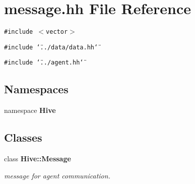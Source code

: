 \section{message.hh File Reference}
\label{message_8hh}


{\tt \#include $<$vector$>$}\par
{\tt \#include \char`\"{}../data/data.hh\char`\"{}}\par
{\tt \#include \char`\"{}../agent.hh\char`\"{}}\par
\subsection*{Namespaces}
\begin{CompactItemize}
\item 
namespace {\bf Hive}
\end{CompactItemize}
\subsection*{Classes}
\begin{CompactItemize}
\item 
class {\bf Hive::Message}
\begin{CompactList}\small\item\em message for agent communication. \item\end{CompactList}\end{CompactItemize}
